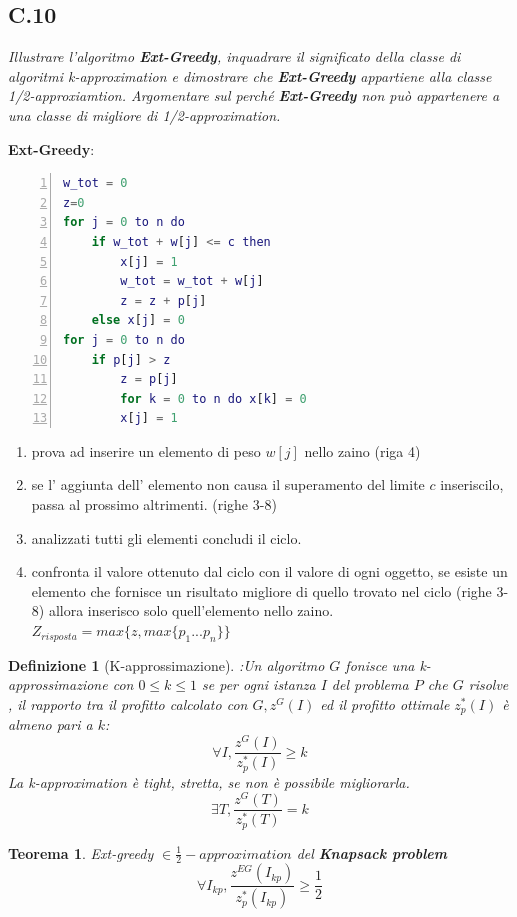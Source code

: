 \documentclass[a4paper]{article}
\newtheorem*{theorem}{Teorema}
\newtheorem*{definition}{Definizione}
\begin{document}
\subsection{C.10}
\emph{Illustrare l’algoritmo \textbf{Ext-Greedy}, inquadrare il significato della classe di algoritmi k-approximation e dimostrare che \textbf{Ext-Greedy} appartiene alla classe 1/2-approxiamtion. Argomentare sul perché \textbf{Ext-Greedy} non può appartenere a una classe di migliore di 1/2-approximation.}


\textbf{Ext-Greedy}:
		\begin{lstlisting}[numbers=left,firstnumber=1,language=Matlab, stepnumber=1, xleftmargin=10pt]
w_tot = 0
z=0
for j = 0 to n do
	if w_tot + w[j] <= c then
		x[j] = 1
		w_tot = w_tot + w[j]
		z = z + p[j]
	else x[j] = 0
for j = 0 to n do
	if p[j] > z
		z = p[j]
		for k = 0 to n do x[k] = 0
		x[j] = 1
		\end{lstlisting}
		\begin{enumerate}
			\item prova ad inserire un elemento di peso $w[j]$ nello zaino (riga 4)
			\item se l' aggiunta dell' elemento non causa il superamento del limite $c$ inseriscilo, passa al prossimo altrimenti. (righe 3-8)
			\item analizzati tutti gli elementi concludi il ciclo.
			\item confronta il valore ottenuto dal ciclo con il valore di ogni oggetto, se esiste un elemento che fornisce un risultato migliore di quello trovato nel ciclo (righe 3-8) allora inserisco solo quell'elemento nello zaino. $Z_{risposta} = max\{z, max\{p_1 ... p_n\}\}$
		\end{enumerate}
		\begin{definition}[K-approssimazione]:Un algoritmo $G$ fonisce una \textit{k-approssimazione} con $0 \leq k \leq 1$ se per ogni istanza $I$ del problema $P$ che $G$ risolve , il rapporto tra il profitto calcolato con $G, z^G(I)$ ed il profitto ottimale $z^*_p(I)$ è almeno pari a $k$:
			$$\forall I, \frac{z^G(I)}{z^*_p(I)} \geq k$$
		La k-approximation è tight, stretta, se non è possibile migliorarla.
			$$\exists T, \frac{z^G(T)}{z^*_p(T)}=k$$
\end{definition}
\begin{theorem} Ext-greedy $\in \frac{1}{2}-approximation$ del \textbf{Knapsack problem}
$$\forall I_{kp}, \frac{z^{EG}(I_{kp})}{z^*_p(I_{kp})} \geq \frac{1}{2}$$
\end{theorem}
\end{document}
